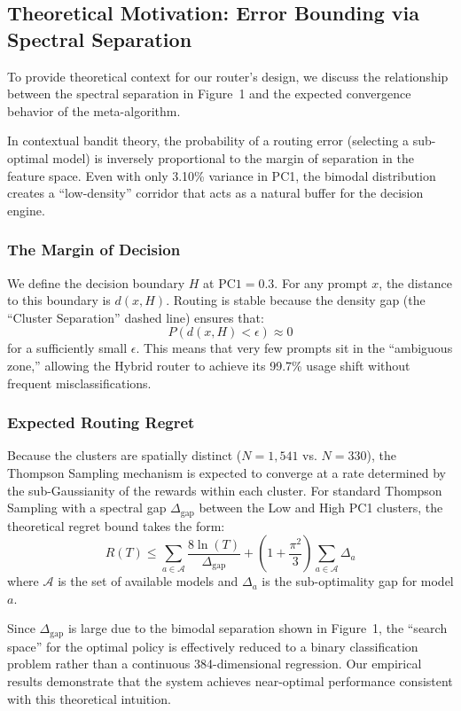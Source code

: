 \subsection{Theoretical Motivation: Error Bounding via Spectral Separation}
\label{appendix:spectral_separation}

To provide theoretical context for our router's design, we discuss the relationship between the spectral separation in Figure~1 and the expected convergence behavior of the meta-algorithm.

In contextual bandit theory, the probability of a routing error (selecting a sub-optimal model) is inversely proportional to the margin of separation in the feature space. Even with only 3.10\% variance in PC1, the bimodal distribution creates a ``low-density'' corridor that acts as a natural buffer for the decision engine.

\subsubsection{The Margin of Decision}

We define the decision boundary $H$ at $\text{PC1} = 0.3$. For any prompt $x$, the distance to this boundary is $d(x, H)$. Routing is stable because the density gap (the ``Cluster Separation'' dashed line) ensures that:
\begin{equation}
P(d(x, H) < \epsilon) \approx 0
\end{equation}
for a sufficiently small $\epsilon$. This means that very few prompts sit in the ``ambiguous zone,'' allowing the Hybrid router to achieve its 99.7\% usage shift without frequent misclassifications.

\subsubsection{Expected Routing Regret}

Because the clusters are spatially distinct ($N=1{,}541$ vs. $N=330$), the Thompson Sampling mechanism is expected to converge at a rate determined by the sub-Gaussianity of the rewards within each cluster. For standard Thompson Sampling with a spectral gap $\Delta_{\text{gap}}$ between the Low and High PC1 clusters, the theoretical regret bound takes the form:
\begin{equation}
R(T) \le \sum_{a \in \mathcal{A}} \frac{8 \ln(T)}{\Delta_{\text{gap}}} + \left(1 + \frac{\pi^2}{3}\right) \sum_{a \in \mathcal{A}} \Delta_a
\end{equation}
where $\mathcal{A}$ is the set of available models and $\Delta_a$ is the sub-optimality gap for model $a$.

Since $\Delta_{\text{gap}}$ is large due to the bimodal separation shown in Figure~1, the ``search space'' for the optimal policy is effectively reduced to a binary classification problem rather than a continuous 384-dimensional regression. Our empirical results demonstrate that the system achieves near-optimal performance consistent with this theoretical intuition.

